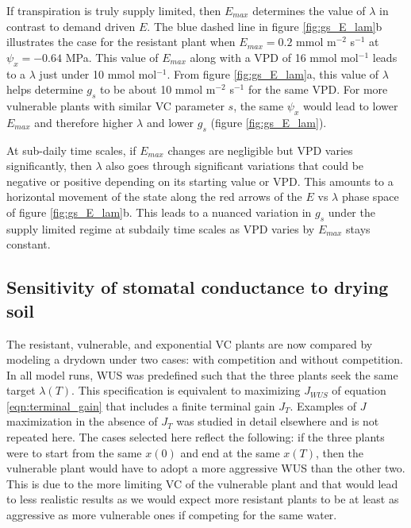 \documentclass[utf8]{frontiersSCNS} %
\begin{document}
If transpiration is truly supply limited, then $E_{max}$ determines the value of $\lambda$ in contrast to demand driven $E$. The blue dashed line in figure \ref{fig:gs_E_lam}b illustrates the case for the resistant plant when $E_{max}=0.2$ mmol m$^{-2}$ s$^{-1}$ at $\psi_x=-0.64$ MPa. This value of $E_{max}$ along with a VPD of 16 mmol mol$^{-1}$ leads to a $\lambda$ just under 10 mmol mol$^{-1}$. From figure \ref{fig:gs_E_lam}a, this value of $\lambda$ helps determine $g_s$ to be about 10 mmol m$^{-2}$ s$^{-1}$ for the same VPD. For more vulnerable plants with similar VC parameter $s$, the same $\psi_x$ would lead to lower $E_{max}$ and therefore higher $\lambda$ and lower $g_s$ (figure \ref{fig:gs_E_lam}). 

At sub-daily time scales, if $E_{max}$ changes are negligible but VPD varies significantly, then $\lambda$ also goes through significant variations that could be negative or positive depending on its starting value or VPD. This amounts to a horizontal movement of the state along the red arrows of the $E$ vs $\lambda$ phase space of figure \ref{fig:gs_E_lam}b. This leads to a nuanced variation in $g_s$ under the supply limited regime at subdaily time scales as VPD varies by $E_{max}$ stays constant.


\subsection{Sensitivity of stomatal conductance to drying soil}

The resistant, vulnerable, and exponential VC plants are now compared by modeling a drydown under two cases: with competition and without competition. In all model runs, WUS was predefined such that the three plants seek the same target $\lambda(T)$. This specification is equivalent to maximizing $J_{WUS}$ of equation \ref{eqn:terminal_gain} that includes a finite terminal gain $J_T$. Examples of $J$ maximization in the absence of $J_T$ was studied in detail elsewhere \citep{manzoni_optimization_2013} and is not repeated here. The cases selected here reflect the following: if the three plants were to start from the same $x(0)$ and end at the same $x(T)$, then the vulnerable plant would have to adopt a more aggressive WUS than the other two. This is due to the more limiting VC of the vulnerable plant and that would lead to less realistic results as we would expect more resistant plants to be at least as aggressive as more vulnerable ones if competing for the same water.
\end{document}
